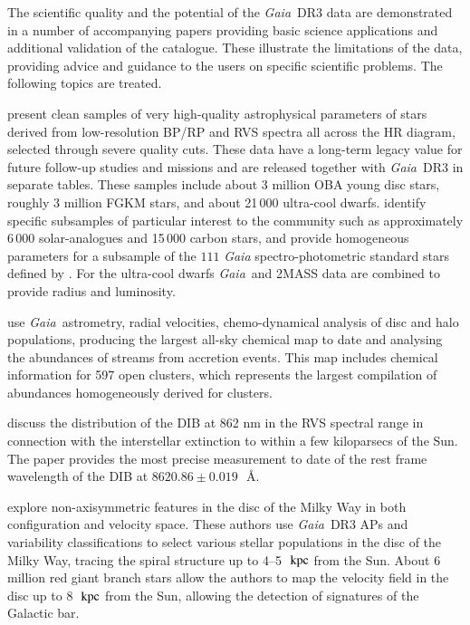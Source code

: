 \documentclass[longauth]{aa}
\providecommand{\bprp}{BP/RP\xspace}
\providecommand{\kpc}{\ensuremath{\,\rm kpc}\xspace}
\providecommand{\ang}{\ensuremath{\,\text{\AA}}\xspace}
\newcommand\gaia{\textit{Gaia}\xspace}
\providecommand\gdrthree{\textit{Gaia}~DR3\xspace}
\begin{document}
The scientific quality and the potential of the \gdrthree data are demonstrated in a number of accompanying papers providing basic science applications and additional validation of the catalogue. These illustrate the limitations of the data, providing advice and guidance to the users on specific scientific problems. The following topics are treated. 

\citet{DR3-DPACP-123} present clean samples of very high-quality   astrophysical parameters of stars  derived from low-resolution \bprp and  RVS spectra all across the HR diagram,  selected through severe quality cuts.  These data have a long-term legacy value for future follow-up studies and missions and are released together with \gdrthree in separate tables. These samples include about 3 million OBA young disc stars, roughly 3 million FGKM stars, and  about 21\,000  ultra-cool dwarfs. \citet{DR3-DPACP-123}  identify specific subsamples  of particular interest to the community such as approximately  6\,000 solar-analogues and 15\,000 carbon stars, and provide homogeneous parameters for a subsample of the $111$ \gaia spectro-photometric standard stars  defined by \citet{DR3-DPACP-137}.   For the ultra-cool dwarfs \gaia\ and 2MASS data are combined to provide radius and luminosity. 

\citet{DR3-DPACP-104}  use \gaia\ astrometry, radial velocities, chemo-dynamical analysis of disc and halo populations, producing the largest  all-sky chemical map to date and analysing the abundances of streams from accretion events. This map includes chemical information for 597 open clusters, which represents the largest compilation of abundances homogeneously derived for clusters.

\citet{DR3-DPACP-144} discuss the distribution of the DIB at 862 nm in the RVS spectral range in connection with the interstellar extinction to within a few kiloparsecs of the Sun. The paper provides the most precise  measurement to date of the rest frame wavelength of the DIB at  $8620.86\pm 0.019$~\ang. 

\citet{DR3-DPACP-75} explore  non-axisymmetric features in the disc of the Milky Way   in both configuration and velocity space. These authors use \gdrthree APs  and variability classifications to select various stellar populations in the disc of the Milky Way, tracing the spiral structure up to 4--5~\kpc from the Sun. About 6 million red giant branch stars  allow the authors to map the velocity field in the disc up to 8~\kpc from the Sun, allowing the detection of signatures of the Galactic bar. 
\end{document}
